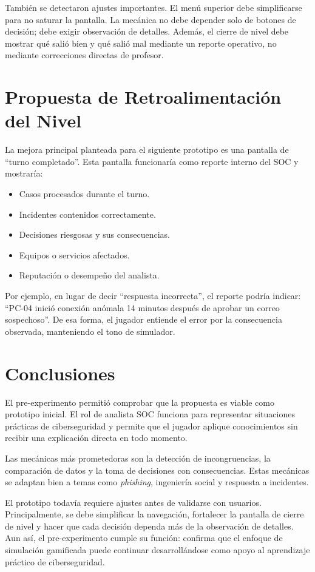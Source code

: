 \documentclass[12pt]{article}
\begin{document}
También se detectaron ajustes importantes. El menú superior debe simplificarse para no saturar la pantalla. La mecánica no debe depender solo de botones de decisión; debe exigir observación de detalles. Además, el cierre de nivel debe mostrar qué salió bien y qué salió mal mediante un reporte operativo, no mediante correcciones directas de profesor.

\section{Propuesta de Retroalimentación del Nivel}

La mejora principal planteada para el siguiente prototipo es una pantalla de ``turno completado''. Esta pantalla funcionaría como reporte interno del SOC y mostraría:

\begin{itemize}
    \item Casos procesados durante el turno.
    \item Incidentes contenidos correctamente.
    \item Decisiones riesgosas y sus consecuencias.
    \item Equipos o servicios afectados.
    \item Reputación o desempeño del analista.
\end{itemize}

Por ejemplo, en lugar de decir ``respuesta incorrecta'', el reporte podría indicar: ``PC-04 inició conexión anómala 14 minutos después de aprobar un correo sospechoso''. De esa forma, el jugador entiende el error por la consecuencia observada, manteniendo el tono de simulador.

\section{Conclusiones}

El pre-experimento permitió comprobar que la propuesta es viable como prototipo inicial. El rol de analista SOC funciona para representar situaciones prácticas de ciberseguridad y permite que el jugador aplique conocimientos sin recibir una explicación directa en todo momento.

Las mecánicas más prometedoras son la detección de incongruencias, la comparación de datos y la toma de decisiones con consecuencias. Estas mecánicas se adaptan bien a temas como \textit{phishing}, ingeniería social y respuesta a incidentes.

El prototipo todavía requiere ajustes antes de validarse con usuarios. Principalmente, se debe simplificar la navegación, fortalecer la pantalla de cierre de nivel y hacer que cada decisión dependa más de la observación de detalles. Aun así, el pre-experimento cumple su función: confirma que el enfoque de simulación gamificada puede continuar desarrollándose como apoyo al aprendizaje práctico de ciberseguridad.
\end{document}
